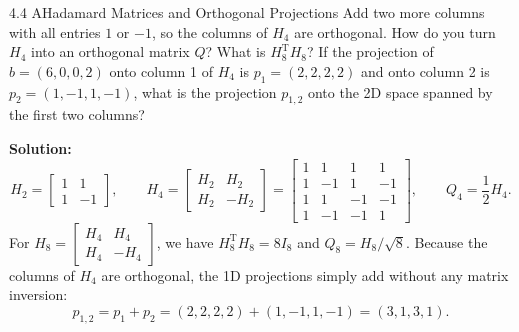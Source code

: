 \documentclass[11pt,a4paper,openany,oneside]{book}
\def\vect#1{#1}%
\def\mathbf#1{#1}%
\newcommand{\vect}[1]{\mathbf{#1}}
\newcommand{\T}{\mathrm{T}}
\numberwithin{equation}{chapter}
\begin{document}
\begin{example}{4.4 A}{Hadamard Matrices and Orthogonal Projections}
Add two more columns with all entries $1$ or $-1$, so the columns of $H_4$ are orthogonal. How do you turn $H_4$ into an orthogonal matrix $Q$? What is $H_8^\T H_8$? If the projection of $\vect{b} = (6, 0, 0, 2)$ onto column 1 of $H_4$ is $\vect{p}_1 = (2, 2, 2, 2)$ and onto column 2 is $\vect{p}_2 = (1, -1, 1, -1)$, what is the projection $\vect{p}_{1,2}$ onto the 2D space spanned by the first two columns?
\end{example}
\textbf{Solution:}
\[
H_2 = \begin{bmatrix} 1 & 1 \\ 1 & -1 \end{bmatrix}, \qquad H_4 = \begin{bmatrix} H_2 & H_2 \\ H_2 & -H_2 \end{bmatrix} = \begin{bmatrix} 1 & 1 & 1 & 1 \\ 1 & -1 & 1 & -1 \\ 1 & 1 & -1 & -1 \\ 1 & -1 & -1 & 1 \end{bmatrix}, \qquad Q_4 = \frac{1}{2}H_4.
\]
For $H_8 = \begin{bmatrix}H_4 & H_4\\H_4 & -H_4\end{bmatrix}$, we have $H_8^\T H_8 = 8I_8$ and $Q_8 = H_8/\sqrt{8}$. Because the columns of $H_4$ are orthogonal, the 1D projections simply add without any matrix inversion:
\[
\vect{p}_{1,2} = \vect{p}_1 + \vect{p}_2 = (2, 2, 2, 2) + (1, -1, 1, -1) = (3, 1, 3, 1).
\]
\end{document}

